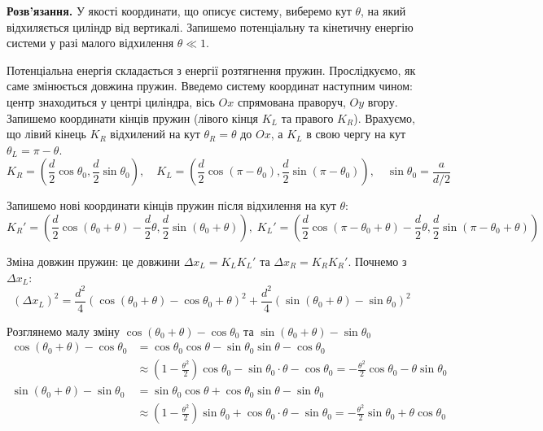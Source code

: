 \documentclass{hw_template}
\begin{document}
\textbf{Розв'язання.} У якості координати, що описує систему, виберемо кут
$\theta$, на який відхиляється циліндр від вертикалі. Запишемо потенціальну та
кінетичну енергію системи у разі малого відхилення $\theta \ll 1$.

Потенціальна енергія складається з енергії розтягнення пружин. Прослідкуємо,
як саме змінюється довжина пружин. Введемо систему координат наступним чином: 
центр знаходиться у центрі циліндра, вісь $Ox$ спрямована праворуч, 
$Oy$ вгору. Запишемо координати кінців пружин (лівого кінця $K_L$ та правого 
$K_R$). Врахуємо, що лівий кінець $K_R$ відхилений на кут $\theta_R=\theta$ до $Ox$, 
а $K_L$ в свою чергу на кут $\theta_L=\pi-\theta$.
\begin{equation*}
    K_R = \left(\frac{d}{2}\cos\theta_0, \frac{d}{2}\sin\theta_0\right), \quad 
    K_L = \left(\frac{d}{2}\cos\left(\pi-\theta_0\right), \frac{d}{2}\sin(\pi-\theta_0)\right), \quad
    \sin\theta_0 = \frac{a}{d/2}
\end{equation*}

Запишемо нові координати кінців пружин після відхилення на кут $\theta$:
\begin{equation*}
    K_R' = \left(\frac{d}{2}\cos(\theta_0+\theta)-\frac{d}{2}\theta, \frac{d}{2}\sin(\theta_0+\theta)\right), 
    \; K_L' = \left(\frac{d}{2}\cos(\pi-\theta_0+\theta)-\frac{d}{2}\theta, \frac{d}{2}\sin(\pi-\theta_0+\theta)\right)
\end{equation*}

Зміна довжин пружин: це довжини $\Delta x_L = K_LK_L'$ та $\Delta x_R
= K_RK_R'$. Почнемо з $\Delta x_L$:
\begin{equation*}
    (\Delta x_L)^2 = \frac{d^2}{4}\left(\cos(\theta_0+\theta)-\cos\theta_0 + \theta\right)^2 + \frac{d^2}{4}\left(\sin(\theta_0+\theta) - \sin\theta_0\right)^2
\end{equation*}

Розглянемо малу зміну $\cos(\theta_0+\theta)-\cos\theta_0$ та $\sin(\theta_0+\theta)-\sin\theta_0$
\begin{align*}
    \cos(\theta_0+\theta) - \cos \theta_0 &= \cos\theta_0\cos\theta - \sin\theta_0\sin\theta - \cos\theta_0 \\
    &\approx \left(1-\frac{\theta^2}{2}\right)\cos\theta_0 - \sin\theta_0 \cdot \theta - \cos\theta_0  
    = -\frac{\theta^2}{2}\cos\theta_0 - \theta\sin\theta_0 \\
    \sin(\theta_0+\theta) - \sin \theta_0 &= \sin\theta_0\cos\theta + \cos\theta_0\sin\theta - \sin\theta_0 \\
    &\approx \left(1-\frac{\theta^2}{2}\right)\sin\theta_0 + \cos\theta_0 \cdot \theta - \sin\theta_0 
    = -\frac{\theta^2}{2}\sin\theta_0 + \theta\cos\theta_0
\end{align*}
\end{document}
